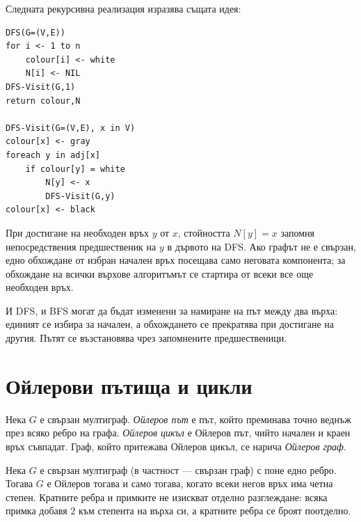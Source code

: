 Следната рекурсивна реализация изразява същата идея:

\begin{verbatim}
DFS(G=(V,E))
for i <- 1 to n
    colour[i] <- white
    N[i] <- NIL
DFS-Visit(G,1)
return colour,N

DFS-Visit(G=(V,E), x in V)
colour[x] <- gray
foreach y in adj[x]
    if colour[y] = white
        N[y] <- x
        DFS-Visit(G,y)
colour[x] <- black
\end{verbatim}

При достигане на необходен връх $y$ от $x$, стойността $N[y]=x$ запомня непосредствения предшественик на $y$ в дървото на DFS. Ако графът не е свързан, едно обхождане от избран начален връх посещава само неговата компонента; за обхождане на всички върхове алгоритъмът се стартира от всеки все още необходен връх.

И DFS, и BFS могат да бъдат изменени за намиране на път между два върха: единият се избира за начален, а обхождането се прекратява при достигане на другия. Пътят се възстановява чрез запомнените предшественици.

\section{Ойлерови пътища и цикли}\label{s:3.6}

\begin{defn}
Нека $G$ е свързан мултиграф. \emph{Ойлеров път} е път, който преминава точно веднъж през всяко ребро на графа. \emph{Ойлеров цикъл} е Ойлеров път, чийто начален и краен връх съвпадат. Граф, който притежава Ойлеров цикъл, се нарича \emph{Ойлеров граф}.
\end{defn}

\begin{keythm}
Нека $G$ е свързан мултиграф (в частност --- свързан граф) с поне едно ребро. Тогава $G$ е Ойлеров тогава и само тогава, когато всеки негов връх има четна степен. Кратните ребра и примките не изискват отделно разглеждане: всяка примка добавя $2$ към степента на върха си, а кратните ребра се броят поотделно.
\end{keythm}

